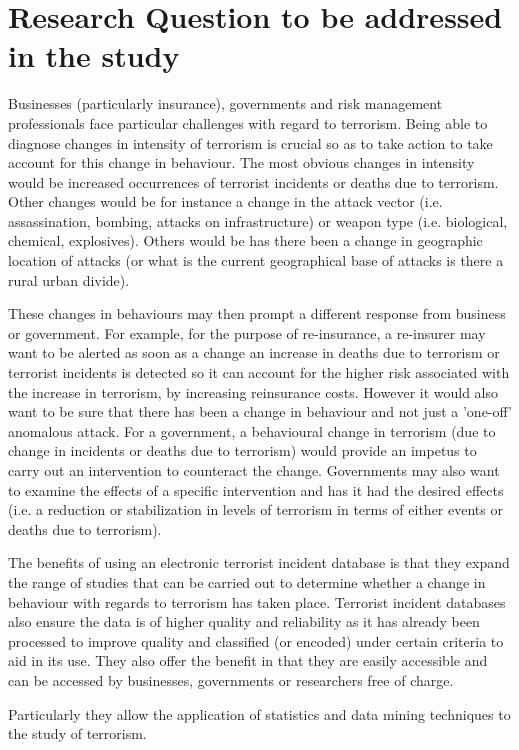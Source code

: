 \section{Research Question to be addressed in the study}
Businesses (particularly insurance), governments and risk management professionals face particular challenges with regard to terrorism. Being able to diagnose changes in intensity of terrorism is crucial so as to take action to take account for this change in behaviour. The most obvious changes in intensity would be increased occurrences of terrorist incidents or deaths due to terrorism. Other changes would be for instance a change in the attack vector (i.e. assassination, bombing, attacks on infrastructure) or weapon type (i.e. biological, chemical, explosives). Others would be has there been a change in geographic location of attacks (or what is the current geographical base of attacks is there a rural urban divide). 

These changes in behaviours may then prompt a different response from business or government. For example, for the purpose of re-insurance, a re-insurer may want to be alerted as soon as a change an increase in deaths due to terrorism or terrorist incidents is detected so it can account for the higher risk associated with the increase in terrorism, by increasing reinsurance costs. However it would also want to be sure that there has been a change in behaviour and not just a 'one-off' anomalous attack. For a government, a behavioural change in terrorism (due to change in incidents or deaths due to terrorism) would provide an impetus to carry out an intervention to counteract the change. Governments may also want to examine the effects of a specific intervention and has it had the desired effects (i.e. a reduction or stabilization in levels of terrorism in terms of either events or deaths due to terrorism). 

The benefits of using an electronic terrorist incident database is that they expand the range of studies that can be carried out to determine whether a change in behaviour with regards to terrorism has taken place. Terrorist incident databases also ensure the data is of higher quality and reliability as it has already been processed to improve quality and classified (or encoded) under certain criteria to aid in its use. They also offer the benefit in that they are easily accessible and can be accessed by businesses, governments or researchers free of charge. 

Particularly they allow the application of statistics and data mining techniques to the study of terrorism.

